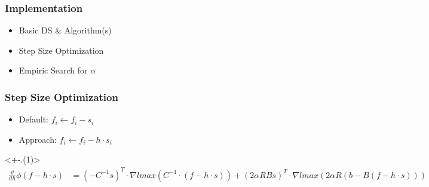 \begin{frame}
\frametitle<+->{Implementation}
\begin{itemize}
\item<+-> Basic DS \& Algorithm(s)
\item<+-> Step Size Optimization
\item<+-> Empiric Search for $\alpha$
\end{itemize}
\end{frame}

\begin{frame}
\frametitle<+->{Step Size Optimization}
\begin{itemize}
\item<+-> Default: $f_i\gets f_i-s_i$
\item<+-> Approach: $f_i\gets f_i-h\cdot s_i$
\end{itemize}
\onslide<+-.(1)>{
\begin{align*}
\frac{\vartheta}{\vartheta h}\phi(f-h\cdot s)&=(-C^{-1}s)^T\cdot \nabla lmax\left(C^{-1}\cdot (f-h\cdot s)\right)+(2\alpha RBs)^T\cdot \nabla lmax\left(2\alpha R(b-B(f-h\cdot s))\right)
\end{align*}
}
\end{frame}




